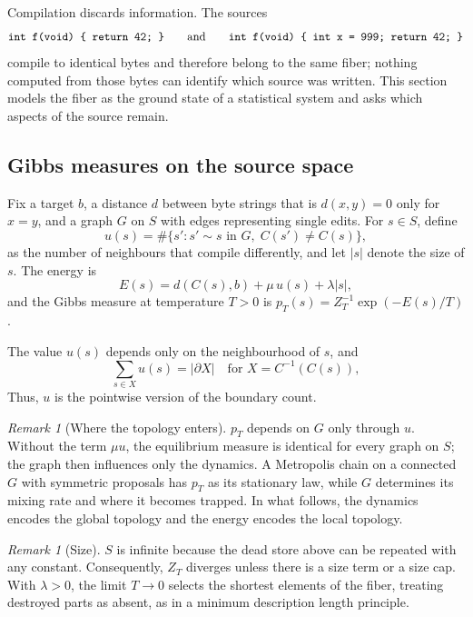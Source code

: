 \documentclass[11pt]{article}
\theoremstyle{definition}
\theoremstyle{remark}
\newtheorem{remark}[theorem]{Remark}
\begin{document}
Compilation discards information. The sources
\[
  \texttt{int f(void) \char123{} return 42; \char125} \qquad \text{and} \qquad \texttt{int f(void) \char123{} int x = 999; return 42; \char125}
\]
compile to identical bytes and therefore belong to the same fiber; nothing computed from those bytes can identify which source was written. This section models the fiber as the ground state of a statistical system and asks which aspects of the source remain.

\subsection{Gibbs measures on the source space}

Fix a target $b$, a distance $d$ between byte strings that is $d(x, y) = 0$ only for $x = y$, and a graph $G$ on $S$ with edges representing single edits. For $s \in S$, define
\[
  u(s) = \#\{ s' : s' \sim s \text{ in } G,\; C(s') \neq C(s) \},
\]
as the number of neighbours that compile differently, and let $|s|$ denote the size of $s$. The energy is
\[
  E(s) = d(C(s), b) + \mu\, u(s) + \lambda |s|,
\]
and the Gibbs measure at temperature $T > 0$ is $p_T(s) = Z_T^{-1} \exp(-E(s)/T)$.

The value $u(s)$ depends only on the neighbourhood of $s$, and
\[
  \sum_{s \in X} u(s) = |\partial X| \quad \text{for } X = C^{-1}(C(s)),
\]
Thus, $u$ is the pointwise version of the boundary count.

\begin{remark}[Where the topology enters]
$p_T$ depends on $G$ only through $u$. Without the term $\mu u$, the equilibrium measure is identical for every graph on $S$; the graph then influences only the dynamics. A Metropolis chain on a connected $G$ with symmetric proposals has $p_T$ as its stationary law, while $G$ determines its mixing rate and where it becomes trapped. In what follows, the dynamics encodes the global topology and the energy encodes the local topology.
\end{remark}

\begin{remark}[Size]
$S$ is infinite because the dead store above can be repeated with any constant. Consequently, $Z_T$ diverges unless there is a size term or a size cap. With $\lambda > 0$, the limit $T \to 0$ selects the shortest elements of the fiber, treating destroyed parts as absent, as in a minimum description length principle.
\end{remark}
\end{document}
